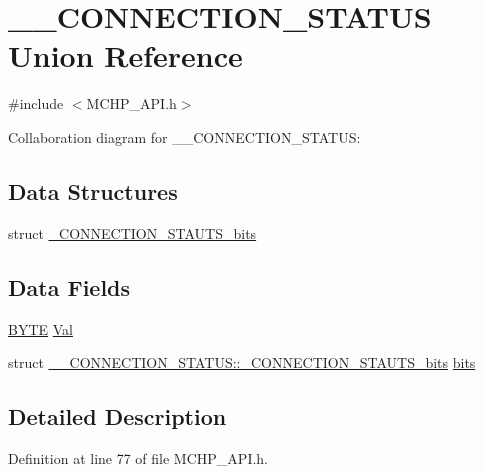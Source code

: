 \hypertarget{union_____c_o_n_n_e_c_t_i_o_n___s_t_a_t_u_s}{}\section{\+\_\+\+\_\+\+C\+O\+N\+N\+E\+C\+T\+I\+O\+N\+\_\+\+S\+T\+A\+T\+U\+S Union Reference}
\label{union_____c_o_n_n_e_c_t_i_o_n___s_t_a_t_u_s}


{\ttfamily \#include $<$M\+C\+H\+P\+\_\+\+A\+P\+I.\+h$>$}



Collaboration diagram for \+\_\+\+\_\+\+C\+O\+N\+N\+E\+C\+T\+I\+O\+N\+\_\+\+S\+T\+A\+T\+U\+S\+:
\subsection*{Data Structures}
\begin{DoxyCompactItemize}
\item 
struct \hyperlink{struct_____c_o_n_n_e_c_t_i_o_n___s_t_a_t_u_s_1_1___c_o_n_n_e_c_t_i_o_n___s_t_a_u_t_s__bits}{\+\_\+\+C\+O\+N\+N\+E\+C\+T\+I\+O\+N\+\_\+\+S\+T\+A\+U\+T\+S\+\_\+bits}
\end{DoxyCompactItemize}
\subsection*{Data Fields}
\begin{DoxyCompactItemize}
\item 
\hyperlink{_generic_type_defs_8h_a4ae1dab0fb4b072a66584546209e7d58}{B\+Y\+T\+E} \hyperlink{union_____c_o_n_n_e_c_t_i_o_n___s_t_a_t_u_s_a5ab8c2bf45b20b5f7aa3a4f083896cec}{Val}
\item 
struct \hyperlink{struct_____c_o_n_n_e_c_t_i_o_n___s_t_a_t_u_s_1_1___c_o_n_n_e_c_t_i_o_n___s_t_a_u_t_s__bits}{\+\_\+\+\_\+\+C\+O\+N\+N\+E\+C\+T\+I\+O\+N\+\_\+\+S\+T\+A\+T\+U\+S\+::\+\_\+\+C\+O\+N\+N\+E\+C\+T\+I\+O\+N\+\_\+\+S\+T\+A\+U\+T\+S\+\_\+bits} \hyperlink{union_____c_o_n_n_e_c_t_i_o_n___s_t_a_t_u_s_aa6caf5f68737fab9c1537e79ef885284}{bits}
\end{DoxyCompactItemize}


\subsection{Detailed Description}


Definition at line 77 of file M\+C\+H\+P\+\_\+\+A\+P\+I.\+h.



